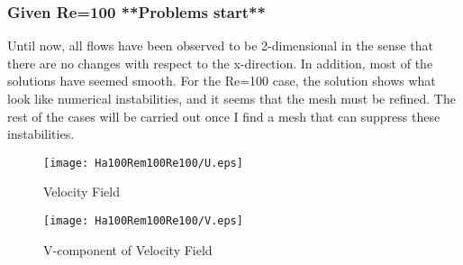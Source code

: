 \documentclass[11pt]{article}
\newcommand{\BfigS}{50em}
\newcommand{\BfigH}{\BfigS}
\newcommand{\BfigW}{\BfigS}
\begin{document}
\subsubsection{Given Re=100 **Problems start**}
Until now, all flows have been observed to be 2-dimensional in the sense that there are no changes with respect to the x-direction. In addition, most of the solutions have seemed smooth. For the Re=100 case, the solution shows what look like numerical instabilities, and it seems that the mesh must be refined. The rest of the cases will be carried out once I find a mesh that can suppress these instabilities.

\begin{figure}[H]
 \centering
  \texttt{[image: Ha100Rem100Re100/U.eps]}
   \caption[Optional ]{Velocity Field}
\end{figure}

\begin{figure}[H]
 \centering
  \texttt{[image: Ha100Rem100Re100/V.eps]}
   \caption[Optional ]{V-component of Velocity Field}
\end{figure}





\end{document}
